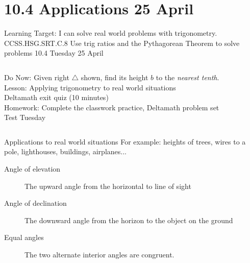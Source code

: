 \documentclass[onlytextwidth, aspectratio=169]{beamer}
\begin{document}
\section{10.4 Applications \hfill 25 April \,}
\begin{frame}{Learning Target: I can solve real world problems with trigonometry.}
  {CCSS.HSG.SRT.C.8 Use trig ratios and the Pythagorean Theorem to solve problems \hfill \alert{10.4 Tuesday 25 April}}
  \begin{columns}
    Do Now: Given right $\triangle$ shown, find its height $b$ to the \emph{nearest tenth}. \\[0.5cm]
    Lesson: Applying trigonometry to real world situations \\
    \alert{Deltamath exit quiz} (10 minutes) \\[0.5cm]
    Homework: Complete the classwork practice, Deltamath problem set \\
    \alert{Test Tuesday}
    \begin{flushright}
    \end{flushright}
  \end{columns}
\end{frame}

\begin{frame}{Applications to real world situations}
  For example: heights of trees, wires to a pole, lighthouses, buildings, airplanes...
  \begin{center}
  \end{center}
  \begin{description}
    \item[Angle of elevation] The upward angle from the horizontal to line of sight
    \item[Angle of declination] The downward angle from the horizon to the object on the ground
    \item[Equal angles] The two alternate interior angles are congruent.
  \end{description}
\end{frame}
\end{document}

